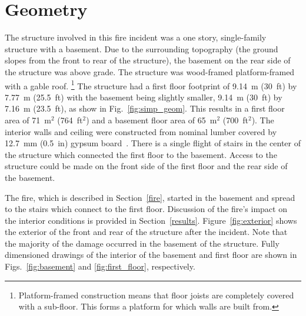 \documentclass[12pt,oneside]{book}
\begin{document}
\section{Geometry}
\label{geom}
The structure involved in this fire incident was a one story, single-family structure with a basement. Due to the surrounding topography (the ground slopes from the front to rear of the structure), the basement on the rear side of the structure was above grade. The structure was wood-framed platform-framed with a gable roof. \footnote{Platform-framed construction means that floor joists are completely covered with a sub-floor. This forms a platform for which walls are built from.} The structure had a first floor footprint of 9.14~m (30~ft) by 7.77~m (25.5~ft) with the basement being slightly smaller, 9.14~m (30~ft) by 7.16~m (23.5~ft), as show in Fig.~\ref{fig:simp_geom}. This results in a first floor area of 71~m$^2$ (764~ft$^2$) and a basement floor area of 65~m$^2$ (700~ft$^2$). The interior walls and ceiling were constructed from nominal lumber covered by 12.7~mm (0.5~in) gypsum board~\cite{PGCounty2013}. There is a single flight of stairs in the center of the structure which connected the first floor to the basement. Access to the structure could be made on the front side of the first floor and the rear side of the basement.

The fire, which is described in Section~\ref{fire}, started in the basement and spread to the stairs which connect to the first floor. Discussion of the fire's impact on the interior conditions is provided in Section~\ref{results}. Figure~\ref{fig:exterior} shows the exterior of the front and rear of the structure after the incident. Note that the majority of the damage occurred in the basement of the structure. Fully dimensioned drawings of the interior of the basement and first floor are shown in Figs.~\ref{fig:basement} and \ref{fig:first_floor}, respectively.
\end{document}
